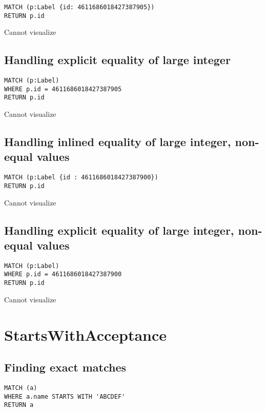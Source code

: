 \begin{lstlisting}
MATCH (p:Label {id: 4611686018427387905})
RETURN p.id
\end{lstlisting}

Cannot visualize
\subsection{Handling explicit equality of large integer}

\begin{lstlisting}
MATCH (p:Label)
WHERE p.id = 4611686018427387905
RETURN p.id
\end{lstlisting}

Cannot visualize
\subsection{Handling inlined equality of large integer, non-equal values}

\begin{lstlisting}
MATCH (p:Label {id : 4611686018427387900})
RETURN p.id
\end{lstlisting}

Cannot visualize
\subsection{Handling explicit equality of large integer, non-equal values}

\begin{lstlisting}
MATCH (p:Label)
WHERE p.id = 4611686018427387900
RETURN p.id
\end{lstlisting}

Cannot visualize
\section{StartsWithAcceptance}

\subsection{Finding exact matches}

\begin{lstlisting}
MATCH (a)
WHERE a.name STARTS WITH 'ABCDEF'
RETURN a
\end{lstlisting}

